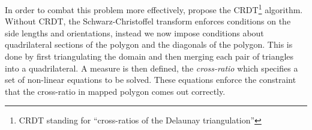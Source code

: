 \documentclass[a4paper,10pt]{amsart}
\newcommand{\sch}{Schwarz-Christoffel }
\begin{document}
In order to combat this problem more effectively, \cite{vavasis96} propose the CRDT\footnote{CRDT standing for ``cross-ratios of the Delaunay triangulation''} algorithm. Without CRDT, the \sch transform enforces conditions on the side lengths and orientations, instead we now impose conditions about quadrilateral sections of the polygon and the diagonals of the polygon. This is done by first triangulating the domain and then merging each pair of triangles into a quadrilateral. A measure is then defined, the \emph{cross-ratio} which specifies a set of non-linear equations to be solved. These equations enforce the constraint that the cross-ratio in mapped polygon comes out correctly. 








\end{document}
